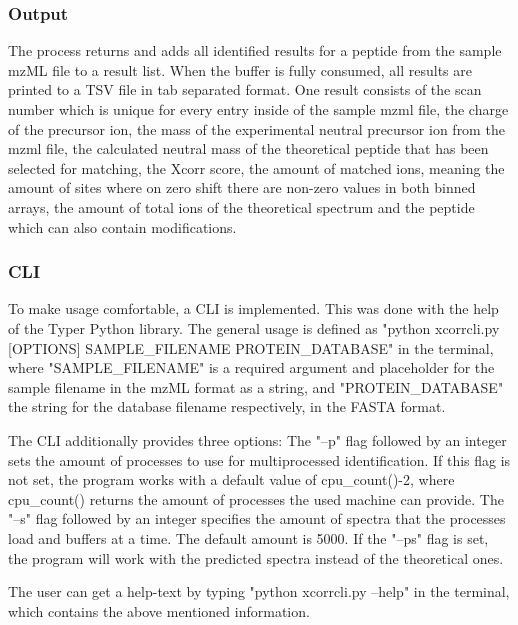 \documentclass[11pt]{article}
\begin{document}
\subsubsection{Output}
The process returns and adds all identified results for a peptide from the sample mzML file to a result list. When the buffer is fully consumed, all results are printed to a TSV file in tab separated format. One result consists of the scan number which is unique for every entry inside of the sample mzml file, the charge of the precursor ion, the mass of the experimental neutral precursor ion from the mzml file, the calculated neutral mass of the theoretical peptide that has been selected for matching, the Xcorr score, the amount of matched ions, meaning the amount of sites where on zero shift there are non-zero values in both binned arrays, the amount of total ions of the theoretical spectrum and the peptide which can also contain modifications.

\subsubsection{CLI}
To make usage comfortable, a CLI is implemented. This was done with the help of the Typer Python library. The general usage is defined as "python xcorrcli.py [OPTIONS] SAMPLE\_FILENAME PROTEIN\_DATABASE" in the terminal, where "SAMPLE\_FILENAME" is a required argument and placeholder for the sample filename in the mzML format as a string, and "PROTEIN\_DATABASE" the string for the database filename respectively, in the FASTA format. 

The CLI additionally provides three options: The "--p" flag followed by an integer sets the amount of processes to use for multiprocessed identification. If this flag is not set, the program works with a default value of cpu\_count()-2, where cpu\_count() returns the amount of processes the used machine can provide. The "--s" flag followed by an integer specifies the amount of spectra that the processes load and buffers at a time. The default amount is 5000. If the "--ps" flag is set, the program will work with the predicted spectra instead of the theoretical ones.

The user can get a help-text by typing "python xcorrcli.py --help" in the terminal, which contains the above mentioned information.
\end{document}
